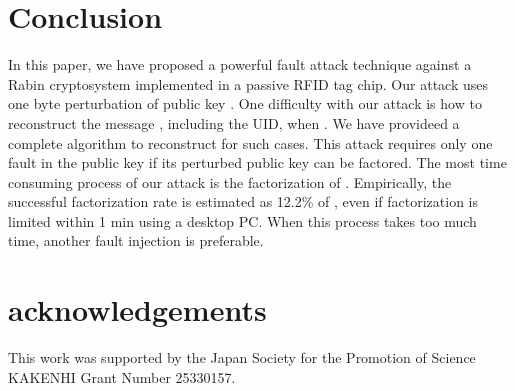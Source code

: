\documentclass{article}
\begin{document}
\section{Conclusion}
In this paper, we have proposed a powerful fault attack technique against a Rabin cryptosystem implemented in 
a passive RFID tag chip. 
Our attack uses one byte perturbation  of public key . 
One difficulty with our attack is how to reconstruct the message , including the UID, when .
We have provideed a complete algorithm to reconstruct  for such cases. 
This attack requires only one fault in the public key if its perturbed public key can be factored.
The most time consuming process of our attack is the factorization of . 
Empirically, the successful factorization rate is estimated as 12.2\% of , 
even if factorization is limited within 1 min using a desktop PC. 
When this process takes too much time, another fault injection is preferable. 


\section*{acknowledgements}
This work was supported by the Japan Society for the Promotion of Science KAKENHI Grant Number 25330157.
\end{document}
